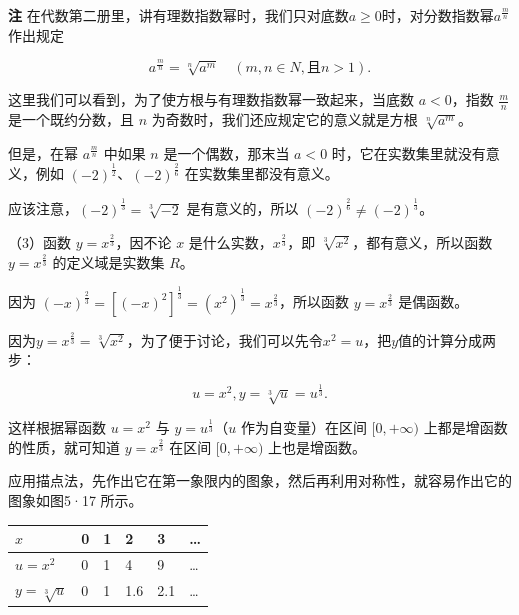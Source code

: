 \textbf{注}
在代数第二册里，讲有理数指数幂时，我们只对底数\(a \geqslant 0\)时，对分数指数幂\(a^{\frac{m}{n}}\)作出规定

\[
a^{\frac{m}{n}} = \sqrt[n]{a^{m}} \quad (m, n \in N, \text{且} n > 1).
\]

这里我们可以看到，为了使方根与有理数指数幂一致起来，当底数 \(a<0\)，指数
\(\frac{m}{n}\)是一个既约分数，且 \(n\)
为奇数时，我们还应规定它的意义就是方根 \(\sqrt[n]{a^m}\)。

但是，在幂 \(a^{\frac{m}{n}}\) 中如果 \(n\) 是一个偶数，那末当 \(a<0\)
时，它在实数集里就没有意义，例如 \((-2)^{\frac12}\)、\((-2)^{\frac26}\)
在实数集里都没有意义。

应该注意，\((-2)^{\frac13}=\sqrt[3]{-2}\) 是有意义的，所以
\((-2)^{\frac26}\ne(-2)^{\frac13}\)。

（3）函数 \(y=x^{\frac23}\)，因不论 \(x\)
是什么实数，\(x^{\frac23}\)，即 \(\sqrt[3]{x^2}\)，都有意义，所以函数
\(y=x^{\frac23}\) 的定义域是实数集 \(R\)。

因为
\((-x)^{\frac23}=[(-x)^2]^{\frac13}=(x^2)^{\frac13}=x^{\frac23}\)，所以函数
\(y=x^{\frac23}\) 是偶函数。

因为\(y = x^{\frac{2}{3}} = \sqrt[3]{x^2}\)，为了便于讨论，我们可以先令\(x^{2} = u\)，把\(y\)值的计算分成两步：

\[
u = x^{2}, y = \sqrt[3]{u} = u^{\frac{1}{3}}.
\]

这样根据幂函数 \(u=x^2\) 与 \(y=u^{\frac13}\)（\(u\) 作为自变量）在区间
\([0,+\infty)\) 上都是增函数的性质，就可知道 \(y=x^{\frac23}\) 在区间
\([0,+\infty)\) 上也是增函数。

应用描点法，先作出它在第一象限内的图象，然后再利用对称性，就容易作出它的图象如图5·17 所示。

\begin{center}
\begin{tabular}{@{}llllll@{}}
\toprule
\(x\) & 0 & 1 & 2 & 3 & \ldots{} \\
\midrule
\(u=x^{2}\) & 0 & 1 & 4 & 9 & \ldots{} \\
\midrule
\(y=\sqrt[3]{u}\) & 0 & 1 & 1.6 & 2.1 & \ldots{} \\
\bottomrule
\end{tabular}
\end{center}


